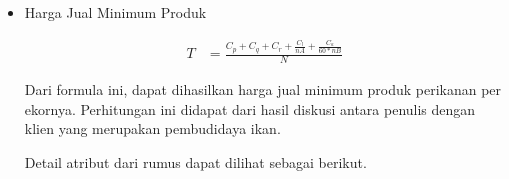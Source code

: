 \begin{spacing}{1.5}
\begin{itemize}
	



	\item Harga Jual Minimum Produk
	
	\begin{equation}
		\begin{split}
			T
			&= \frac{C_p + C_q + C_r + \frac{C_l}{nA} + \frac{C_a}{60 * nB}}{N}
		\end{split}
	\end{equation}

	Dari formula ini, dapat dihasilkan harga jual minimum produk perikanan per ekornya. Perhitungan ini didapat dari hasil diskusi antara penulis dengan klien yang merupakan pembudidaya ikan.

	Detail atribut dari rumus dapat dilihat sebagai berikut.

\end{itemize}


\end{spacing}
